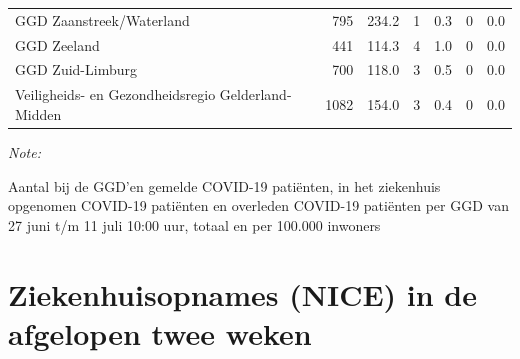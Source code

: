 \documentclass[
  english,
  man,floatsintext]{apa6}
\begin{document}
\begin{table}
\begin{threeparttable}
\begin{tabular}{lrrrrrr}
GGD Zaanstreek/Waterland & 795 & 234.2 & 1 & 0.3 & 0 & 0.0\\
GGD Zeeland & 441 & 114.3 & 4 & 1.0 & 0 & 0.0\\
GGD Zuid-Limburg & 700 & 118.0 & 3 & 0.5 & 0 & 0.0\\
Veiligheids- en Gezondheidsregio Gelderland-Midden & 1082 & 154.0 & 3 & 0.4 & 0 & 0.0\\
\bottomrule
\end{tabular}
\begin{tablenotes}
\item \textit{Note: } 
\item Aantal bij de GGD’en gemelde COVID-19 patiënten, in het ziekenhuis opgenomen COVID-19 patiënten en overleden COVID-19 patiënten per GGD van 27 juni t/m 11 juli 10:00 uur, totaal en per 100.000 inwoners
\end{tablenotes}
\end{threeparttable}
\endgroup{}
\end{table}

\newpage

\hypertarget{ziekenhuisopnames-nice-in-de-afgelopen-twee-weken}{%
\section{Ziekenhuisopnames (NICE) in de afgelopen twee weken}\label{ziekenhuisopnames-nice-in-de-afgelopen-twee-weken}}
\end{document}

